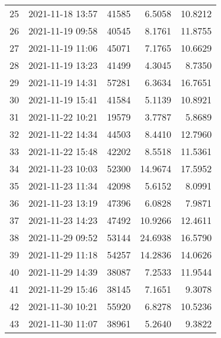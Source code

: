 \begin{table}
\begin{tabular}{rlrrr}
  25 & 2021-11-18 13:57 &   41585 &  6.5058 & 10.8212 \\
  26 & 2021-11-19 09:58 &   40545 &  8.1761 & 11.8755 \\
  27 & 2021-11-19 11:06 &   45071 &  7.1765 & 10.6629 \\
  28 & 2021-11-19 13:23 &   41499 &  4.3045 &  8.7350 \\
  29 & 2021-11-19 14:31 &   57281 &  6.3634 & 16.7651 \\
  30 & 2021-11-19 15:41 &   41584 &  5.1139 & 10.8921 \\
  31 & 2021-11-22 10:21 &   19579 &  3.7787 &  5.8689 \\
  32 & 2021-11-22 14:34 &   44503 &  8.4410 & 12.7960 \\
  33 & 2021-11-22 15:48 &   42202 &  8.5518 & 11.5361 \\
  34 & 2021-11-23 10:03 &   52300 & 14.9674 & 17.5952 \\
  35 & 2021-11-23 11:34 &   42098 &  5.6152 &  8.0991 \\
  36 & 2021-11-23 13:19 &   47396 &  6.0828 &  7.9871 \\
  37 & 2021-11-23 14:23 &   47492 & 10.9266 & 12.4611 \\
  38 & 2021-11-29 09:52 &   53144 & 24.6938 & 16.5790 \\
  39 & 2021-11-29 11:18 &   54257 & 14.2836 & 14.0626 \\
  40 & 2021-11-29 14:39 &   38087 &  7.2533 & 11.9544 \\
  41 & 2021-11-29 15:46 &   38145 &  7.1651 &  9.3078 \\
  42 & 2021-11-30 10:21 &   55920 &  6.8278 & 10.5236 \\
  43 & 2021-11-30 11:07 &   38961 &  5.2640 &  9.3822 \\
\bottomrule
\end{tabular}
\end{table}
